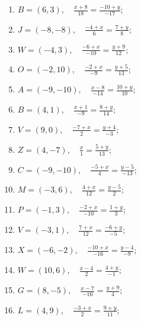 	\begin{enumerate}
		\setcounter{enumi}{\value{tasks}}
			
			\item \( \displaystyle B = \left( 6, 3 \right), \quad \frac{x+8}{18} = \frac{-10+y}{-17} \);
			\item \( \displaystyle J = \left( -8, -8 \right), \quad \frac{-4+x}{6} = \frac{7+y}{8} \);
			\item \( \displaystyle W = \left( -4, 3 \right), \quad \frac{-6+x}{-10} = \frac{y+9}{12} \);
			\item \( \displaystyle O = \left( -2, 10 \right), \quad \frac{-2+x}{-9} = \frac{y+5}{13} \);
			\item \( \displaystyle A = \left( -9, -10 \right), \quad \frac{x-8}{-14} = \frac{10+y}{10} \);
			\item \( \displaystyle B = \left( 4, 1 \right), \quad \frac{x+1}{-9} = \frac{8+y}{14} \);
			\item \( \displaystyle V = \left( 9, 0 \right), \quad \frac{-7+x}{2} = \frac{y+4}{-3} \);
			\item \( \displaystyle Z = \left( 4, -7 \right), \quad \frac{x}{1} = \frac{5+y}{13} \);
			\item \( \displaystyle C = \left( -9, -10 \right), \quad \frac{-5+x}{4} = \frac{y-5}{-13} \);
			\item \( \displaystyle M = \left( -3, 6 \right), \quad \frac{4+x}{12} = \frac{y-5}{2} \);
			\item \( \displaystyle P = \left( -1, 3 \right), \quad \frac{-2+x}{-10} = \frac{1+y}{3} \);
			\item \( \displaystyle V = \left( -3, 1 \right), \quad \frac{7+x}{12} = \frac{-6+y}{-5} \);
			\item \( \displaystyle X = \left( -6, -2 \right), \quad \frac{-10+x}{-16} = \frac{y-4}{-9} \);
			\item \( \displaystyle W = \left( 10, 6 \right), \quad \frac{x-4}{2} = \frac{4+y}{-1} \);
			\item \( \displaystyle G = \left( 8, -5 \right), \quad \frac{x-7}{-16} = \frac{y+9}{4} \);
			\item \( \displaystyle L = \left( 4, 9 \right), \quad \frac{-3+x}{2} = \frac{9+y}{11} \);

		\setcounter{tasks}{\value{enumi}}
	\end{enumerate}

